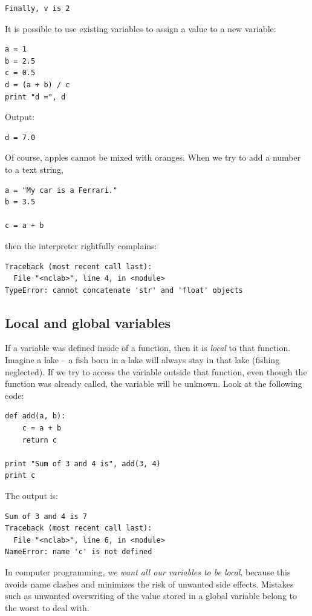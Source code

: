 \begin{verbatim}
Finally, v is 2
\end{verbatim}
It is possible to use existing variables to assign a value to a new variable:

\begin{verbatim}
a = 1
b = 2.5
c = 0.5
d = (a + b) / c
print "d =", d
\end{verbatim}
Output:

\begin{verbatim}
d = 7.0
\end{verbatim}
Of course, apples cannot be mixed with oranges. When we try to 
add a number to a text string,

\begin{verbatim}
a = "My car is a Ferrari."
b = 3.5

c = a + b
\end{verbatim}
then the interpreter rightfully complains:

\begin{verbatim}
Traceback (most recent call last):
  File "<nclab>", line 4, in <module>
TypeError: cannot concatenate 'str' and 'float' objects
\end{verbatim}

\subsection{Local and global variables}

If a variable was defined inside of a function, then it is {\em local} to that
function. Imagine a lake -- a fish born in a lake will always 
stay in that lake (fishing neglected). If we try to access 
the variable outside that function, even though the function was 
already called, the variable will be unknown. Look at the following 
code:

\begin{verbatim}
def add(a, b):
    c = a + b
    return c

print "Sum of 3 and 4 is", add(3, 4)
print c
\end{verbatim}
The output is:

\begin{verbatim}
Sum of 3 and 4 is 7
Traceback (most recent call last):
  File "<nclab>", line 6, in <module>
NameError: name 'c' is not defined
\end{verbatim}
In computer programming, {\em we want all our variables to be local}, because 
this avoids name clashes and minimizes the risk of unwanted side effects.
Mistakes such as unwanted overwriting of the value stored in a global variable 
belong to the worst to deal with.

